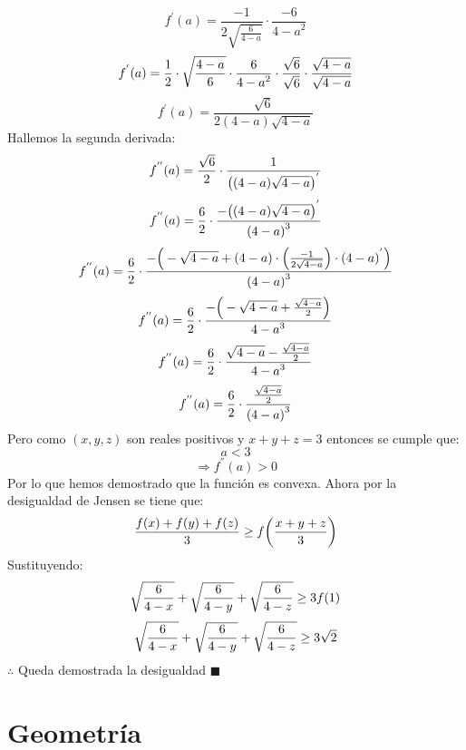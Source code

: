 \documentclass{book}
\begin{document}
\begin{enumerate}
          $$f^{'} (a)=\frac{-1}{2\sqrt{\frac{6}{4-a}}}\cdot\frac{-6}{{4-a}^2}$$
          $$f^{'} (a)={1\over 2}\cdot\sqrt{\frac{4-a}{6}}\cdot\frac{6}{{4-a}^2} \cdot{\sqrt{6}\over\sqrt{6}}\cdot{\sqrt{4-a}\over\sqrt{4-a}}$$
          $$f^{'} (a)=\frac{\sqrt{6}}{2(4-a) \sqrt{4-a}}$$
          Hallemos la segunda derivada:
          $$f^{''} (a)={\sqrt{6}\over 2}\cdot\frac{1}{{\big((4-a)\sqrt{4-a}\big)}^{'}}$$
          $$f^{''} (a)={6\over 2}\cdot\frac{{-\big((4-a) \sqrt{4-a}\big)}^{'}}{{(4-a)}^3} $$
          $$f^{''} (a)={6\over 2}\cdot\frac{-\Big(-\sqrt{4-a}+(4-a)\cdot\Big(\frac{-1}{2\sqrt{4-a}}\Big)\cdot{(4-a)}^{'} \Big)}{{(4-a)}^3} $$
          $$f^{''} (a)={6\over 2}\cdot\frac{-\Big(-\sqrt{4-a}+\frac{\sqrt{4-a}}{2}\Big)}{{4-a}^3} $$
          $$f^{''} (a)={6\over 2}\cdot\frac{\sqrt{4-a}-\frac{\sqrt{4-a}}{2}}{{4-a}^3} $$
          $$f^{''} (a)={6\over 2}\cdot\frac{\frac{\sqrt{4-a}}{2}}{{(4-a)}^3} $$
          Pero como $(x,y,z)$ son reales positivos y $x+y+z=3$ entonces se cumple que:
          $$a<3$$
          $$\Rightarrow f^{''} (a)>0$$
          Por lo que hemos demostrado que la función es convexa. Ahora por la desigualdad de Jensen se tiene que:
          $${f(x)+f(y)+f(z)\over 3}\geq f\bigg({x+y+z\over 3}\bigg)$$
          Sustituyendo:
          $$\sqrt{{6\over 4-x}}+\sqrt{{6\over 4-y}}+\sqrt{{6\over 4-z}}\geq 3f(1)$$
          $$\sqrt{{6\over 4-x}}+\sqrt{{6\over 4-y}}+\sqrt{{6\over 4-z}}\geq 3\sqrt{2}$$
          $\therefore$ Queda demostrada la desigualdad $\blacksquare$\\
\end{enumerate}


\chapter{Geometría}
\end{document}
